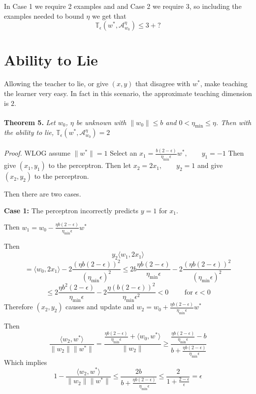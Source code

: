 \documentclass{article}
\newcommand{\learn}{\mathcal{A}_{w_0}^\eta}
\begin{document}
In Case 1 we require 2 examples and and Case 2 we require 3, so including the examples needed to bound $\eta$ we get that 
$$
\mathbb{T}_\epsilon(w^*, \learn) \leq 3 + ?
$$

\section{Ability to Lie}
Allowing the teacher to lie, or give $(x,y)$ that disagree with $w^*$, make teaching the learner very easy. In fact in this scenario, the approximate teaching dimension is $2$.
\\
\\
\textbf{Theorem 5.} \textit{
Let $w_0$, $\eta$ be unknown with $\lVert w_0 \rVert \leq b$ and $0 < \eta_{\min} \leq \eta$.
Then with the ability to lie, $\mathbb{T}_{\epsilon}(w^*, \learn) = 2$
}
\\
\\
\textit{Proof.}
WLOG assume $\lVert w^* \rVert = 1$
Select an $x_1 = \frac{b(2-\epsilon)}{\eta_{\min} \epsilon}w^*, \qquad y_1 = -1$
Then give $(x_1 , y _1)$ to the perceptron.
Then let $x_2 = 2x_1, \qquad y_2 = 1$ and give $(x_2, y_2)$ to the perceptron.

Then there are two cases.

\textbf{Case 1:} The perceptron incorrectly predicts $y = 1$ for $x_1$.

Then 
$
w_1 = w_0 - \frac{\eta b(2-\epsilon)}{\eta_{\min} \epsilon}w^*
$

Then 
$$y_2 \langle w_1, 2x_1 \rangle
$$
$$
 = \langle w_0, 2x_1 \rangle - 2\frac{(\eta b(2-\epsilon))^2}{(\eta_{\min}\epsilon)^2}
 \leq 2b\frac{\eta b(2-\epsilon)}{\eta_{\min}\epsilon}
-  2\frac{(\eta b(2-\epsilon))^2}{(\eta_{\min}\epsilon)^2} 
$$
$$
\leq 2\frac{\eta b^2(2-\epsilon)}{\eta_{\min}\epsilon}
-  2\frac{\eta (b(2-\epsilon))^2}{\eta_{\min}\epsilon^2}
< 0 \qquad \text{ for } \epsilon < 0
$$
Therefore $(x_2, y_2)$ causes and update and
$w_2 =  w_0 + \frac{\eta b(2-\epsilon)}{\eta_{\min} \epsilon}w^* $

Then
$$
\frac{\langle w_2 , w^* \rangle}{\lVert w_2 \rVert \lVert w^* \rVert} = \frac{\frac{\eta b(2-\epsilon)}{\eta_{\min} \epsilon} + \langle w_0, w^* \rangle}{\lVert w_2 \rVert} \geq \frac{\frac{\eta b(2-\epsilon)}{\eta_{\min} \epsilon} - b}{b + \frac{\eta b(2-\epsilon)}{\eta_{\min} \epsilon}}
$$
Which implies
$$
1 - \frac{\langle w_2 , w^* \rangle}{\lVert w_2 \rVert \lVert w^* \rVert} \leq \frac{2b}{b + \frac{\eta b(2-\epsilon)}{\eta_{\min} \epsilon}}
\leq
\frac{2}{1 + \frac{2-\epsilon}{\epsilon}} = \epsilon
$$
\end{document}
